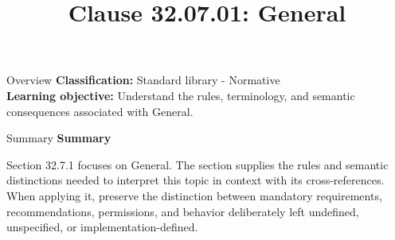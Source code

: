 \documentclass[10pt,letterpaper]{article}
\title{Clause 32.07.01: General}
\author{}
\date{}
\begin{document}
\maketitle
\begin{CornellOverviewBox}{Overview}
\textbf{Classification:} Standard library - Normative\\[2pt]
\textbf{Learning objective:} Understand the rules, terminology, and semantic consequences associated with General.
\end{CornellOverviewBox}\begin{CornellSummaryBox}{Summary}
{\sffamily\bfseries\color{Accent} Summary}\par\vspace{3pt}Section 32.7.1 focuses on General. The section supplies the rules and semantic distinctions needed to interpret this topic in context with its cross-references. When applying it, preserve the distinction between mandatory requirements, recommendations, permissions, and behavior deliberately left undefined, unspecified, or implementation-defined.
\end{CornellSummaryBox}
\end{document}
